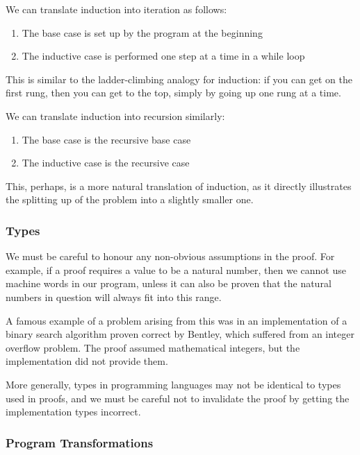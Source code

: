 We can translate induction into iteration as follows:

\begin{enumerate}
  \item The base case is set up by the program at the beginning
  \item The inductive case is performed one step at a time in a while
    loop
\end{enumerate}

This is similar to the ladder-climbing analogy for induction: if you
can get on the first rung, then you can get to the top, simply by
going up one rung at a time.

We can translate induction into recursion similarly:

\begin{enumerate}
  \item The base case is the recursive base case
  \item The inductive case is the recursive case
\end{enumerate}

This, perhaps, is a more natural translation of induction, as it
directly illustrates the splitting up of the problem into a slightly
smaller one.

\subsubsection{Types}
\label{sec:lit-verification-extraction-types}

We must be careful to honour any non-obvious assumptions in the
proof. For example, if a proof requires a value to be a natural
number, then we cannot use machine words in our program, unless it can
also be proven that the natural numbers in question will always fit
into this range.

A famous example of a problem arising from this was in an
implementation of a binary search algorithm proven correct by
Bentley\cite{Bentley86}, which suffered from an integer overflow
problem. The proof assumed mathematical integers, but the
implementation did not provide them.

More generally, types in programming languages may not be identical to
types used in proofs, and we must be careful not to invalidate the
proof by getting the implementation types incorrect.

\subsubsection{Program Transformations}
\label{sec:lit-verification-extraction-transformation}

